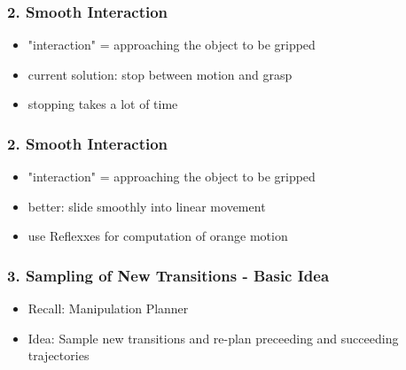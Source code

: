 \documentclass[12pt, %
			  t     %
]{beamer}%
\begin{document}
\begin{frame}
\frametitle{2. Smooth Interaction}
  \begin{itemize}
    \item "interaction" = approaching the object to be gripped
  \end{itemize}

  \centering
    \begin{itemize}
      \item current solution: stop between motion and grasp
      \item stopping takes a lot of time
    \end{itemize} 
\end{frame}


\begin{frame}
\frametitle{2. Smooth Interaction}
  \begin{itemize}
    \item "interaction" = approaching the object to be gripped
  \end{itemize}
  
  \centering
  \begin{itemize}
    \item better: slide smoothly into linear movement
    \item use Reflexxes for computation of orange motion
  \end{itemize}
\end{frame}

\begin{frame}
\frametitle{3. Sampling of New Transitions - Basic Idea}
\begin{itemize}
  \item Recall: Manipulation Planner
  \item Idea: Sample new transitions and re-plan preceeding and succeeding trajectories
\end{itemize}
\end{frame}
\end{document}
